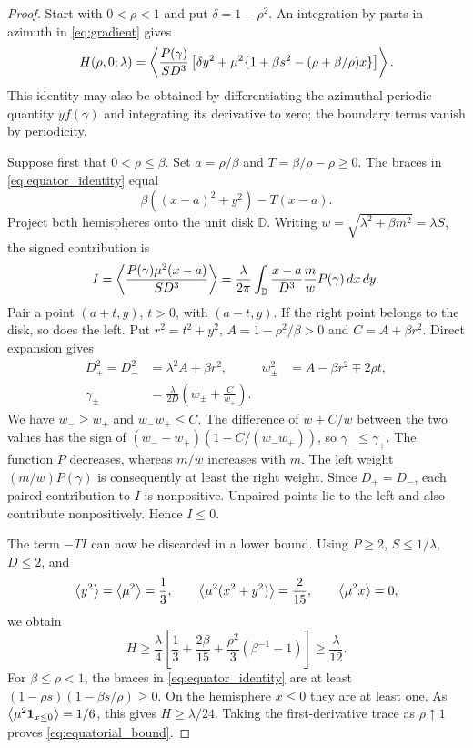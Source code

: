 \begin{proof}
Start with $0<\rho<1$ and put $\delta=1-\rho^2$. An integration by parts in azimuth in \eqref{eq:gradient} gives
\begin{equation}\label{eq:equator_identity}
 H(\rho,0;\lambda)=\left\langle \frac{P(\gamma)}{SD^3}
 \left[\delta y^2+\mu^2\{1+\beta s^2-(\rho+\beta/\rho)x\}\right]\right\rangle.
\end{equation}
This identity may also be obtained by differentiating the azimuthal periodic quantity $y f(\gamma)$ and integrating its derivative to zero; the boundary terms vanish by periodicity.

Suppose first that $0<\rho\le\beta$. Set $a=\rho/\beta$ and $T=\beta/\rho-\rho\ge0$. The braces in \eqref{eq:equator_identity} equal
\[
 \beta((x-a)^2+y^2)-T(x-a).
\]
Project both hemispheres onto the unit disk $\mathbb D$. Writing $w=\sqrt{\lambda^2+\beta m^2}=\lambda S$, the signed contribution is
\begin{equation}\label{eq:reflection_I}
 I=\left\langle \frac{P(\gamma)\mu^2(x-a)}{SD^3}\right\rangle
 =\frac{\lambda}{2\pi}\int_{\mathbb D}\frac{x-a}{D^3}\frac m w P(\gamma)\,dx\,dy.
\end{equation}
Pair a point $(a+t,y)$, $t>0$, with $(a-t,y)$. If the right point belongs to the disk, so does the left. Put $r^2=t^2+y^2$, $A=1-\rho^2/\beta>0$ and $C=A+\beta r^2$. Direct expansion gives
\begin{align}
 D_+^2=D_-^2&=\lambda^2A+\beta r^2,&
 w_\pm^2&=A-\beta r^2\mp2\rho t,\label{eq:mirror_equalities}\\
 \gamma_\pm&=\frac{\lambda}{2D}\left(w_\pm+\frac C{w_\pm}\right).\nonumber
\end{align}
We have $w_-\ge w_+$ and $w_-w_+\le C$. The difference of $w+C/w$ between the two values has the sign of $(w_--w_+)(1-C/(w_-w_+))$, so $\gamma_-\le\gamma_+$. The function $P$ decreases, whereas $m/w$ increases with $m$. The left weight $(m/w)P(\gamma)$ is consequently at least the right weight. Since $D_+=D_-$, each paired contribution to $I$ is nonpositive. Unpaired points lie to the left and also contribute nonpositively. Hence $I\le0$.

The term $-TI$ can now be discarded in a lower bound. Using $P\ge2$, $S\le1/\lambda$, $D\le2$, and
\[
 \left\langle y^2\right\rangle=\left\langle \mu^2\right\rangle=\frac13,\qquad
 \left\langle \mu^2(x^2+y^2)\right\rangle=\frac2{15},\qquad \left\langle \mu^2x\right\rangle=0,
\]
we obtain
\begin{equation}\label{eq:equator_inner}
 H\ge\frac\lambda4\left[\frac13+\frac{2\beta}{15}
       +\frac{\rho^2}{3}(\beta^{-1}-1)\right]\ge\frac\lambda{12}.
\end{equation}
For $\beta\le\rho<1$, the braces in \eqref{eq:equator_identity} are at least $(1-\rho s)(1-\beta s/\rho)\ge0$. On the hemisphere $x\le0$ they are at least one. As $\left\langle \mu^2\mathbf 1_{x\le0}\right\rangle=1/6$, this gives $H\ge\lambda/24$. Taking the first-derivative trace as $\rho\uparrow1$ proves \eqref{eq:equatorial_bound}.
\end{proof}

